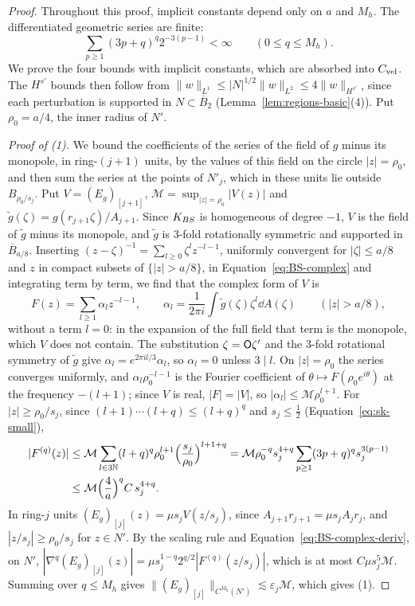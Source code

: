 \begin{proof}
Throughout this proof, implicit constants depend only on $a$ and $M_h$.
The differentiated geometric series are finite:
\[
\sum_{p\ge1}(3p+q)^q2^{-3(p-1)}<\infty
\qquad(0\le q\le M_h).
\]
We prove the four bounds with implicit constants, which are absorbed into
$C_{\mathrm{vel}}$.
The $H^{s'}$ bounds then follow from
$\|w\|_{L^1}\le |N|^{1/2}\|w\|_{L^2}\le4\|w\|_{H^{s'}}$,
since each perturbation is supported in $N\subset\overline B_2$
(Lemma~\ref{lem:regions-basic}(4)). Put $\rho_0=a/4$, the inner radius of $N'$.

\emph{Proof of (1).} We bound the coefficients of the series of the field of
$g$ minus its monopole, in ring-$(j+1)$ units, by the values of this field on the circle $|z|=\rho_0$, and then sum
the series at the points of $N'_j$, which in these units lie outside
$B_{\rho_0/s_j}$. Put $V=(E_g)_{[j+1]}$,
$\mathcal M=\sup_{|z|=\rho_0}|V(z)|$ and
$\tilde g(\zeta)=g(r_{j+1}\zeta)/A_{j+1}$. Since $K_{BS}$ is homogeneous of degree
$-1$, $V$ is the field of $\tilde g$ minus its monopole, and $\tilde g$ is
$3$-fold rotationally symmetric and supported in $\overline B_{a/8}$. Inserting
$(z-\zeta)^{-1}=\sum_{l\ge0}\zeta^lz^{-l-1}$, uniformly convergent for
$|\zeta|\le a/8$ and $z$ in compact subsets of $\{|z|>a/8\}$, in
Equation~\eqref{eq:BS-complex} and integrating term by term, we find that the
complex form of $V$ is
\[
F(z)=\sum_{l\ge1}\alpha_lz^{-l-1},\qquad \alpha_l=\frac1{2\pi i}\int\tilde g(\zeta)\zeta^l\dd A(\zeta)\qquad(|z|>a/8),
\]
without a term $l=0$: in the expansion of the full field that term is the
monopole, which $V$ does not contain. The substitution $\zeta=\mathsf{O}\zeta'$ and the $3$-fold
rotational symmetry of $\tilde g$ give
$\alpha_l=e^{2\pi il/3}\alpha_l$, so $\alpha_l=0$ unless $3\mid l$. On
$|z|=\rho_0$ the series converges uniformly, and $\alpha_l\rho_0^{-l-1}$ is the
Fourier coefficient of $\theta\mapsto F(\rho_0e^{i\theta})$ at the frequency
$-(l+1)$; since $V$ is real, $|F|=|V|$, so $|\alpha_l|\le\mathcal M\rho_0^{l+1}$. For
$|z|\ge\rho_0/s_j$, since $(l+1)\cdots(l+q)\le(l+q)^q$ and $s_j\le\frac12$
(Equation~\eqref{eq:sk-small}),
\begin{align*}
|F^{(q)}(z)|&\le\mathcal M\sum_{l\in 3\mathbb{N}}(l+q)^q\rho_0^{l+1}\Big(\frac{s_j}{\rho_0}\Big)^{l+1+q}
=\mathcal M\rho_0^{-q}s_j^{4+q}\sum_{p\ge1}(3p+q)^qs_j^{3(p-1)}\\
&\le\mathcal M\Big(\frac4a\Big)^qC\,s_j^{4+q}.
\end{align*}
In ring-$j$ units
$(E_g)_{[j]}(z)=\mu s_jV(z/s_j)$, since $A_{j+1}r_{j+1}=\mu s_jA_jr_j$, and
$|z/s_j|\ge\rho_0/s_j$ for $z\in N'$. By the scaling rule and
Equation~\eqref{eq:BS-complex-deriv}, on $N'$,
$|\nabla^q(E_g)_{[j]}(z)|=\mu s_j^{1-q}2^{q/2}|F^{(q)}(z/s_j)|$, which is at most
$C\mu s_j^5\mathcal M$. Summing over $q\le M_h$ gives
$\|(E_g)_{[j]}\|_{C^{M_h}(N')}\lesssim\varepsilon_j\mathcal M$,
which gives (1).


\end{proof}
